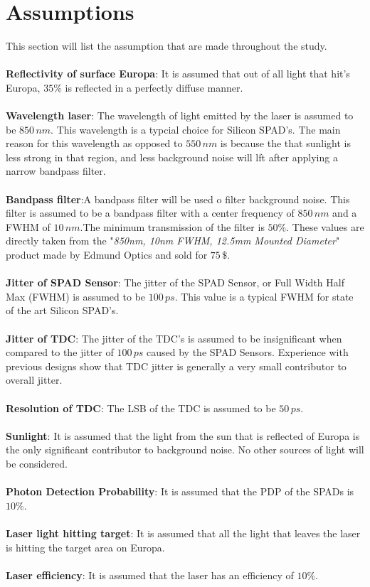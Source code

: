 \section{Assumptions} 
\label{ssec:assumptions}
This section will list the assumption that are made throughout the study.\\
\\
\textbf{Reflectivity of surface Europa}: It is assumed that out of all light that hit's Europa, $35\%$ is reflected in a perfectly diffuse manner.\\ 
\\
\textbf{Wavelength laser}: The wavelength of light emitted by the laser is assumed to be $850\,nm$. This wavelength is a typcial choice for Silicon SPAD's. The main reason for this wavelength as opposed to $550\,nm$ is because the that sunlight is less strong in that region, and less background noise will lft after applying a narrow bandpass filter. \\
\\
\textbf{Bandpass filter}:A bandpass filter will be used o filter background noise. This filter is assumed to be a bandpass filter with a center frequency of $850\,nm$ and a FWHM of $10\,nm$.The minimum transmission of the filter is $50\%$. These values are directly taken from the "\textit{850nm, 10nm FWHM, 12.5mm Mounted Diameter}" product made by Edmund Optics and sold for $75\,\$$.\\
\\
\textbf{Jitter of SPAD Sensor}: The jitter of the SPAD Sensor, or Full Width Half Max (FWHM) is assumed to be $100\,ps$. This value is a typical FWHM for state of the art Silicon SPAD's. \\
\\
\textbf{Jitter of TDC}: The jitter of the TDC's is assumed to be insignificant when compared to the jitter of $100\,ps$ caused by the SPAD Sensors. Experience with previous designs show that TDC jitter is generally a very small contributor to overall jitter.\\
\\
\textbf{Resolution of TDC}: The LSB of the TDC is assumed to be $50\,ps$.\\
\\
\textbf{Sunlight}: It is assumed that the light from the sun that is reflected of Europa is the only significant contributor to background noise. No other sources of light will be considered. \\
\\
\textbf{Photon Detection Probability}: It is assumed that the PDP of the SPADs is $10\%$.\\
\\
\textbf{Laser light hitting target}: It is assumed that all the light that leaves the laser is hitting the target area on Europa.
\\
\\
\textbf{Laser efficiency}: It is assumed that the laser has an efficiency of $10\%$.
